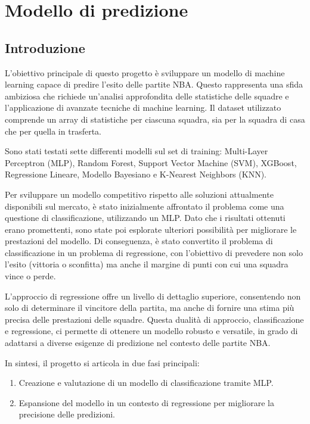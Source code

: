 \section{Modello di predizione}
\subsection{Introduzione}
L'obiettivo principale di questo progetto è sviluppare un modello di machine learning capace di predire l'esito delle partite NBA. Questo rappresenta una sfida ambiziosa che richiede un'analisi approfondita delle statistiche delle squadre e l'applicazione di avanzate tecniche di machine learning. Il dataset utilizzato comprende un array di statistiche per ciascuna squadra, sia per la squadra di casa che per quella in trasferta.

Sono stati testati sette differenti modelli sul set di training: Multi-Layer Perceptron (MLP), Random Forest, Support Vector Machine (SVM), XGBoost, Regressione Lineare, Modello Bayesiano e K-Nearest Neighbors (KNN).

Per sviluppare un modello competitivo rispetto alle soluzioni attualmente disponibili sul mercato, è stato inizialmente affrontato il problema come una questione di classificazione, utilizzando un MLP. Dato che i risultati ottenuti erano promettenti, sono state poi esplorate ulteriori possibilità per migliorare le prestazioni del modello. Di conseguenza, è stato convertito il problema di classificazione in un problema di regressione, con l'obiettivo di prevedere non solo l'esito (vittoria o sconfitta) ma anche il margine di punti con cui una squadra vince o perde.

L'approccio di regressione offre un livello di dettaglio superiore, consentendo non solo di determinare il vincitore della partita, ma anche di fornire una stima più precisa delle prestazioni delle squadre. Questa dualità di approccio, classificazione e regressione, ci permette di ottenere un modello robusto e versatile, in grado di adattarsi a diverse esigenze di predizione nel contesto delle partite NBA.

In sintesi, il progetto si articola in due fasi principali:
\begin{enumerate}
    \item Creazione e valutazione di un modello di classificazione tramite MLP.
    \item Espansione del modello in un contesto di regressione per migliorare la precisione delle predizioni.
\end{enumerate}

